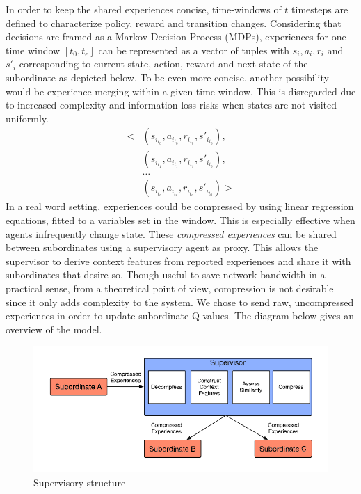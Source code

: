 \documentclass[letterpaper]{article}
\begin{document}
In order to keep the shared experiences concise, time-windows of $t$ timesteps are defined to characterize policy, reward and transition changes. Considering that decisions are framed as a Markov Decision Process (MDPs), experiences for one time window $[t_{0}, t_{e}]$ can be represented as a vector of tuples with $s_i, a_i, r_i$ and $s'_i$ corresponding to current state, action, reward and next state of the subordinate as depicted below. To be even more concise, another possibility would be experience merging within a given time window. This is disregarded due to increased complexity and information loss risks when states are not visited uniformly.
\begin{align*}
 \biggl<
  & (s_{i_{t_0}},a_{i_{t_0}},r_{i_{t_0}},s'_{i_{t_0}}), \\
  & (s_{i_{t_1}},a_{i_{t_1}},r_{i_{t_1}},s'_{i_{t_0}}), \\
  & \hdots                                              \\
  & (s_{i_{t_e}},a_{i_{t_e}},r_{i_{t_e}},s'_{i_{t_0}})
 \biggr>
\end{align*}
In a real word setting, experiences could be compressed by using linear regression equations, fitted to a variables set in the window. This is especially effective when agents infrequently change state. These \textit{compressed experiences} can be shared between subordinates using a supervisory agent as proxy. This allows the supervisor to derive context features from reported experiences and share it with subordinates that desire so. Though useful to save network bandwidth in a practical sense, from a theoretical point of view, compression is not desirable since it only adds complexity to the system. We chose to send raw, uncompressed experiences in order to update subordinate Q-values. The diagram below gives an overview of the model.
\begin{figure}[ht]
 \begin{center}
  \includegraphics[width=\linewidth]{figures/diagram}
  \caption{Supervisory structure \citep{garant2015accelerating}}
  \label{fig:diagram}
 \end{center}
\end{figure}
\end{document}
